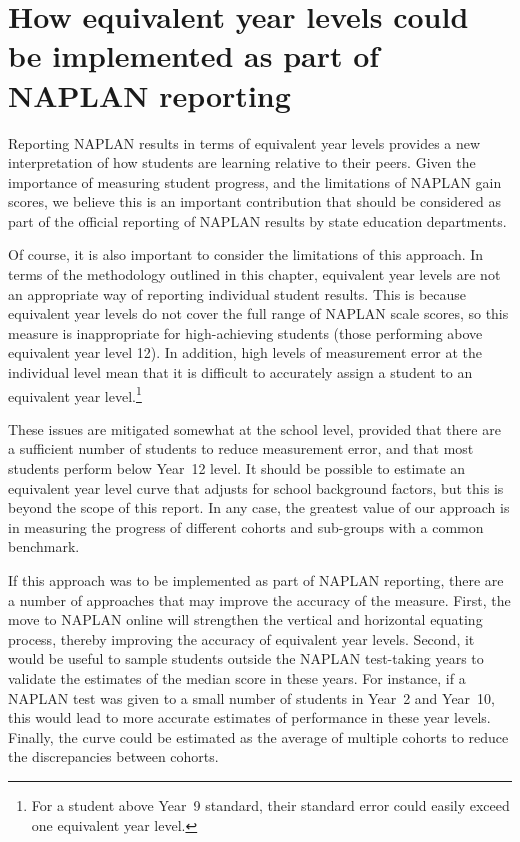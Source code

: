 \newpage
\section{How equivalent year levels could be implemented as part of NAPLAN reporting}

Reporting NAPLAN results in terms of equivalent year levels provides a new interpretation of how students are learning relative to their peers. Given the importance of measuring student progress, and the limitations of NAPLAN gain scores, we believe this is an important contribution that should be considered as part of the official reporting of NAPLAN results by state education departments.

Of course, it is also important to consider the limitations of this approach. In terms of the methodology outlined in this chapter, equivalent year levels are not an appropriate way of reporting individual student results. This is because equivalent year levels do not cover the full range of NAPLAN scale scores, so this measure is inappropriate for high-achieving students (those performing above equivalent year level 12). In addition, high levels of measurement error at the individual level mean that it is difficult to accurately assign a student to an equivalent year level.\footnote{For a student above \mbox{Year 9} standard, their standard error could easily exceed one equivalent year level.}

\newpage
These issues are mitigated somewhat at the school level, provided that there are a sufficient number of students to reduce measurement error, and that most students perform below \mbox{Year 12} level. It should be possible to estimate an equivalent year level curve that adjusts for school background factors, but this is beyond the scope of this report. In any case, the greatest value of our approach is in measuring the progress of different cohorts and sub-groups with a common benchmark.

If this approach was to be implemented as part of NAPLAN reporting, there are a number of approaches that may improve the accuracy of the measure. First, the move to NAPLAN online will strengthen the vertical and horizontal equating process, thereby improving the accuracy of equivalent year levels. Second, it would be useful to sample students outside the NAPLAN test-taking years to validate the estimates of the median score in these years. For instance, if a NAPLAN test was given to a small number of students in \mbox{Year 2} and \mbox{Year 10}, this would lead to more accurate estimates of performance in these year levels. Finally, the curve could be estimated as the average of multiple cohorts to reduce the discrepancies between cohorts. 








